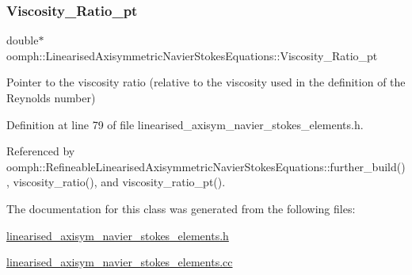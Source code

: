 \subsubsection{\texorpdfstring{Viscosity\+\_\+\+Ratio\+\_\+pt}{Viscosity\_Ratio\_pt}}
{\footnotesize\ttfamily double$\ast$ oomph\+::\+Linearised\+Axisymmetric\+Navier\+Stokes\+Equations\+::\+Viscosity\+\_\+\+Ratio\+\_\+pt\hspace{0.3cm}{\ttfamily [protected]}}



Pointer to the viscosity ratio (relative to the viscosity used in the definition of the Reynolds number) 



Definition at line 79 of file linearised\+\_\+axisym\+\_\+navier\+\_\+stokes\+\_\+elements.\+h.



Referenced by oomph\+::\+Refineable\+Linearised\+Axisymmetric\+Navier\+Stokes\+Equations\+::further\+\_\+build(), viscosity\+\_\+ratio(), and viscosity\+\_\+ratio\+\_\+pt().



The documentation for this class was generated from the following files\+:\begin{DoxyCompactItemize}
\item 
\hyperlink{linearised__axisym__navier__stokes__elements_8h}{linearised\+\_\+axisym\+\_\+navier\+\_\+stokes\+\_\+elements.\+h}\item 
\hyperlink{linearised__axisym__navier__stokes__elements_8cc}{linearised\+\_\+axisym\+\_\+navier\+\_\+stokes\+\_\+elements.\+cc}\end{DoxyCompactItemize}
